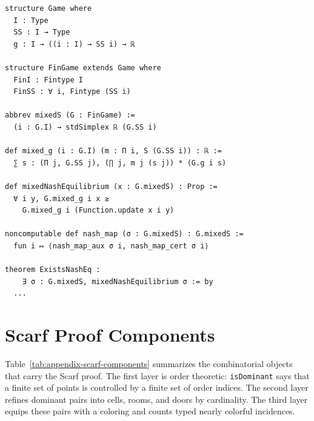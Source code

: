 \documentclass{article}
\theoremstyle{definition}
\begin{document}
\begin{lstlisting}[caption={Representative interfaces for the Nash endpoint.},label={lst:app-nash-interface}]
structure Game where
  I : Type
  SS : I → Type
  g : I → ((i : I) → SS i) → ℝ

structure FinGame extends Game where
  FinI : Fintype I
  FinSS : ∀ i, Fintype (SS i)

abbrev mixedS (G : FinGame) :=
  (i : G.I) → stdSimplex ℝ (G.SS i)

def mixed_g (i : G.I) (m : Π i, S (G.SS i)) : ℝ :=
  ∑ s : (Π j, G.SS j), (∏ j, m j (s j)) * (G.g i s)

def mixedNashEquilibrium (x : G.mixedS) : Prop :=
  ∀ i y, G.mixed_g i x ≥
    G.mixed_g i (Function.update x i y)

noncomputable def nash_map (σ : G.mixedS) : G.mixedS :=
  fun i ↦ ⟨nash_map_aux σ i, nash_map_cert σ i⟩

theorem ExistsNashEq :
    ∃ σ : G.mixedS, mixedNashEquilibrium σ := by
  ...
\end{lstlisting}

\section{Scarf Proof Components}
\label{app:scarf-details}

Table~\ref{tab:appendix-scarf-components} summarizes the combinatorial objects that carry the Scarf proof. The first layer is order theoretic: \texttt{isDominant} says that a finite set of points is controlled by a finite set of order indices. The second layer refines dominant pairs into cells, rooms, and doors by cardinality. The third layer equips these pairs with a coloring and counts typed nearly colorful incidences.
\end{document}
